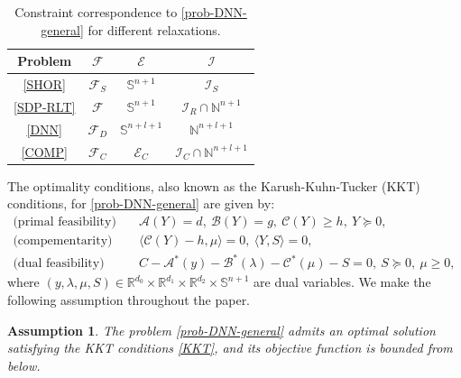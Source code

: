 \documentclass[11pt]{article}
\theoremstyle{plain}
\newtheorem{assumption}{Assumption}
\def\<{\big\langle}
\def\>{\big\rangle}
\def\E{\mathcal{E}}
\def\A{ \mathcal{A} }
\def\B{\mathcal{B}}
\def\C{\mathcal{C}}
\def\F{\mathcal{F}}
\def\I{\mathcal{I}}
\def\R{\mathbb{R}}
\def\S{\mathbb{S}}
\begin{document}
\begin{center}
\begin{table}[h!]
\begin{center}
    \def\arraystretch{1.5}
    \setlength{\tabcolsep}{5pt} 
    \begin{tabular}{|c|c|c|c|} 
     \hline
    \multicolumn{1}{|c|}{Problem} & $\F$ & $\E$ & $\I$   \\ 
     \hline
     \eqref{SHOR} & $ \F_S $   &   $\S^{n+1}$ & $ \I_S$ \\
     \hline  
     \eqref{SDP-RLT}  & $ \F $   &   $\S^{n+1}$ & $ \I_R \cap \mathbb{N}^{n+1}$ \\ 
     \hline
     \eqref{DNN}  & $\F_D$   &   $\S^{n+l+1}$ & $\mathbb{N}^{n+l+1}$ \\ 
     \hline
     \eqref{COMP} & $\F_C$   &   $\E_C$ & $\I_C\cap\mathbb{N}^{n+l+1}$ \\ 
     \hline    
     \end{tabular}
    \caption{Constraint correspondence to \eqref{prob-DNN-general} for different relaxations.}
    \label{tab-general}
\end{center}
\end{table}
\end{center}

The optimality conditions, also known as the Karush-Kuhn-Tucker (KKT) conditions, for \eqref{prob-DNN-general} are given by:
\begin{equation}\label{KKT}
\begin{aligned}
\text{(primal feasibility)}&\quad \A (Y)=d,\ \B (Y)= g,\ \C (Y)\geq h,\ Y\succeq 0,\\[2pt]
\text{(compementarity)}&\quad
\< \C (Y)-h, \mu \> = 0,\ \<Y,S\>=0,\\[2pt]
\text{(dual feasibility)}&\quad C - \A^*(y) - \B^*(\lambda)-\C^* (\mu) -S= 0,\ S\succeq 0,\ \mu\geq 0,
\end{aligned}
\end{equation}
where $(y,\lambda,\mu,S)\in \R^{d_0}\times \R^{d_1}\times \R^{d_2}\times \mathbb{S}^{n+1} $ are dual variables.
We make the following assumption throughout the paper. 
\begin{assumption}\label{assumption-mild}
    The problem \eqref{prob-DNN-general} admits an optimal solution satisfying the KKT conditions \eqref{KKT}, and its objective function is bounded from below.
\end{assumption}
\end{document}
